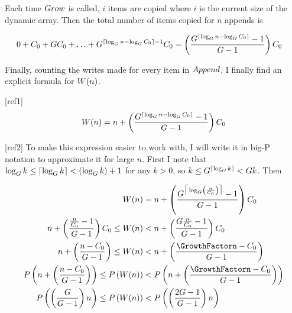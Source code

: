 Each time $Grow$ is called, $i$ items are copied where $i$ is the current size of the dynamic array. Then the total number of items copied for $n$ appends is

\begin{align*}
0 + C_0 + GC_0 + \ldots + G^{\lceil \log_{G} n - \log_{G} C_0 \rceil - 1}C_0 &= \left( \frac{G^{\lceil \log_{G} n - \log_{G} C_0 \rceil} - 1}{G - 1} \right) C_0
\end{align*}

Finally, counting the writes made for every item in $Append$, I finally find an explicit formula for $W(n)$.

[ref1]
$$
W(n) = n + \left( \frac{G^{\lceil \log_{G} n - \log_{G} C_0 \rceil} - 1}{G - 1} \right) C_0
$$

[ref2]
To make this expression easier to work with, I will write it in big-P notation to approximate it for large $n$. First I note that $\log_{G} k \leq \lceil \log_{G} k \rceil < \left( \log_{G} k \right) + 1$ for any $k > 0$, so $k \leq G^{\lceil \log_{G} k \rceil} < G{k}$. Then

\begin{align*}
\nwritesfn(n) &= n + \left( \frac{\GrowthFactor^{\big\lceil \log_{\GrowthFactor} \left( \frac {n} {\InitCapacity} \right) \big\rceil} - 1}{\GrowthFactor - 1} \right) \InitCapacity\\
n + \left( \frac{\frac{n}{\InitCapacity} - 1}{\GrowthFactor - 1} \right) \InitCapacity \leq \nwritesfn(n) &< n + \left( \frac{\GrowthFactor\frac{n}{\InitCapacity} - 1}{\GrowthFactor - 1} \right) \InitCapacity\\
n + \left( \frac{n - \InitCapacity}{\GrowthFactor - 1} \right) \leq \nwritesfn(n) &< n + \left( \frac{\GrowthFactorn - \InitCapacity}{\GrowthFactor - 1} \right)\\
P\left( n + \left( \frac{n - \InitCapacity}{\GrowthFactor - 1} \right) \right) \leq P\left( \nwritesfn(n) \right) &< P\left( n + \left( \frac{\GrowthFactorn - \InitCapacity}{\GrowthFactor - 1} \right) \right)\\
P\left( \left( \frac{\GrowthFactor}{\GrowthFactor - 1} \right) n \right) \leq P\left( \nwritesfn(n) \right) &< P\left( \left( \frac{2\GrowthFactor - 1}{\GrowthFactor - 1} \right) n \right)
\end{align*}

